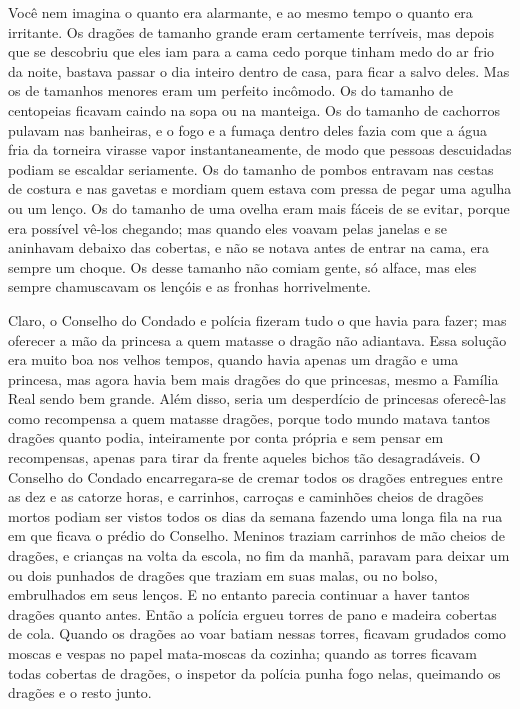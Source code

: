 Você nem imagina o quanto era alarmante, e ao mesmo tempo o quanto era
irritante. Os dragões de tamanho grande eram certamente terríveis,
mas depois que se descobriu que eles iam para a cama cedo porque
tinham medo do ar frio da noite, bastava passar o dia inteiro dentro
de casa, para ficar a salvo deles. Mas os de tamanhos menores eram um
perfeito incômodo. Os do tamanho de centopeias ficavam caindo na sopa
ou na manteiga. Os do tamanho de cachorros pulavam nas banheiras, e o
fogo e a fumaça dentro deles fazia com que a água fria da torneira
virasse vapor instantaneamente, de modo que pessoas descuidadas
podiam se escaldar seriamente. Os do tamanho de pombos entravam nas
cestas de costura e nas gavetas e mordiam quem estava com pressa de
pegar uma agulha ou um lenço. Os do tamanho de uma ovelha eram mais
fáceis de se evitar, porque era possível vê-los chegando; mas quando
eles voavam pelas janelas e se aninhavam debaixo das cobertas, e não
se notava antes de entrar na cama, era sempre um choque. Os desse
tamanho não comiam gente, só alface, mas eles sempre chamuscavam os
lençóis e as fronhas horrivelmente. 

Claro, o Conselho do Condado e polícia fizeram tudo o que havia para
fazer; mas oferecer a mão da princesa a quem matasse o dragão não
adiantava. Essa solução era muito boa nos velhos tempos, quando havia
apenas um dragão e uma princesa, mas agora havia bem mais dragões do
que princesas, mesmo a Família Real sendo bem grande. Além disso,
seria um desperdício de princesas oferecê-las como recompensa a quem
matasse dragões, porque todo mundo matava tantos dragões quanto
podia, inteiramente por conta própria e sem pensar em recompensas,
apenas para tirar da frente aqueles bichos tão desagradáveis. O
Conselho do Condado encarregara-se de cremar todos os dragões
entregues entre as dez e as catorze horas, e carrinhos, carroças e
caminhões cheios de dragões mortos podiam ser vistos todos os dias da
semana fazendo uma longa fila na rua em que ficava o prédio do
Conselho. Meninos traziam carrinhos de mão cheios de dragões, e
crianças na volta da escola, no fim da manhã, paravam para deixar um
ou dois punhados de dragões que traziam em suas malas, ou no bolso,
embrulhados em seus lenços. E no entanto parecia continuar a haver
tantos dragões quanto antes. Então a polícia ergueu torres de pano e
madeira cobertas de cola. Quando os dragões ao voar batiam nessas
torres, ficavam grudados como moscas e vespas no papel mata-moscas da
cozinha; quando as torres ficavam todas cobertas de dragões, o
inspetor da polícia punha fogo nelas, queimando os dragões e o resto
junto.

